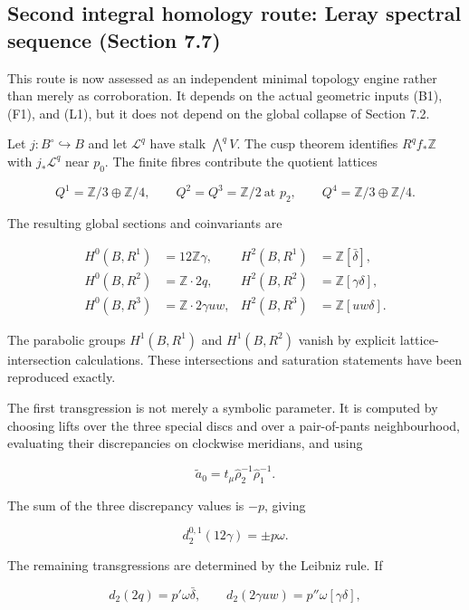 \documentclass[
  10pt,
  letterpaper,
]{article}
\begin{document}
\subsection{Second integral homology route: Leray spectral sequence
(Section
7.7)}\label{second-integral-homology-route-leray-spectral-sequence-section-7.7}

This route is now assessed as an independent minimal topology engine
rather than merely as corroboration. It depends on the actual geometric
inputs (B1), (F1), and (L1), but it does not depend on the global
collapse of Section 7.2.

Let \(j:B^\circ\hookrightarrow B\) and let \(\mathcal L^q\) have stalk
\(\bigwedge^qV\). The cusp theorem identifies \(R^qf_*\mathbb Z\) with
\(j_*\mathcal L^q\) near \(p_0\). The finite fibres contribute the
quotient lattices

\[
Q^1=\mathbb Z/3\oplus\mathbb Z/4,
\qquad
Q^2=Q^3=\mathbb Z/2\ \text{at }p_2,
\qquad
Q^4=\mathbb Z/3\oplus\mathbb Z/4.
\]

The resulting global sections and coinvariants are

\[
\begin{aligned}
H^0(B,R^1)&=12\mathbb Z\gamma,& H^2(B,R^1)&=\mathbb Z[\bar\delta],\\
H^0(B,R^2)&=\mathbb Z\cdot2q,& H^2(B,R^2)&=\mathbb Z[\gamma\delta],\\
H^0(B,R^3)&=\mathbb Z\cdot2\gamma uw,& H^2(B,R^3)&=\mathbb Z[uw\delta].
\end{aligned}
\]

The parabolic groups \(H^1(B,R^1)\) and \(H^1(B,R^2)\) vanish by
explicit lattice-intersection calculations. These intersections and
saturation statements have been reproduced exactly.

The first transgression is not merely a symbolic parameter. It is
computed by choosing lifts over the three special discs and over a
pair-of-pants neighbourhood, evaluating their discrepancies on clockwise
meridians, and using

\[
\widetilde a_0=t_\mu\hat\rho_2^{-1}\hat\rho_1^{-1}.
\]

The sum of the three discrepancy values is \(-p\), giving

\[
d_2^{0,1}(12\gamma)=\pm p\omega.
\]

The remaining transgressions are determined by the Leibniz rule. If

\[
d_2(2q)=p'\omega\bar\delta,
\qquad
d_2(2\gamma uw)=p''\omega[\gamma\delta],
\]
\end{document}
